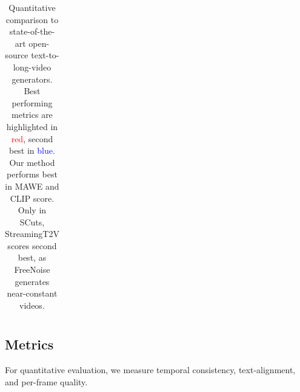 \begin{table}[tb]
\begin{tabular}{@{}l|ll|l@{}}
        \bottomrule
    \end{tabular}
    \caption{
        Quantitative comparison to state-of-the-art open-source text-to-long-video generators. 
        Best performing metrics are highlighted in \textcolor{red}{red}, second best in \textcolor{blue}{blue}. Our method performs best
        in MAWE and CLIP score. Only in SCuts, StreamingT2V scores second best, as FreeNoise generates near-constant videos. 
    }
    \label{table:automatic}
\end{table}


\subsection{Metrics}
\label{sec:experiments.metrics}
For quantitative evaluation, we measure temporal consistency, text-alignment, and per-frame quality.

